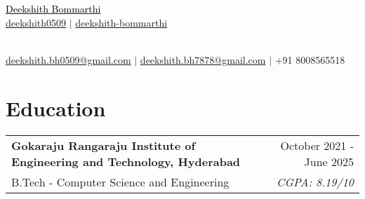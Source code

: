 \documentclass[a4paper,10pt]{article}
\newcommand{\sectionheader}[2]{%
    \begin{center}
        \textcolor{myblue}{\Huge #1} \\[6pt]
        \textcolor{mydarkblue}{\raisebox{-0.05\height}{\faGithub} \href{#2}{deekshith0509}} $|$
        \textcolor{mydarkblue}{\raisebox{-0.05\height}{\faLinkedin} \href{https://www.linkedin.com/in/deekshith-bommarthi}{deekshith-bommarthi}}
    \end{center}
}
\begin{document}
\begin{center}
    \parbox{\linewidth}{%
        \centering
        \sectionheader{\href{https://deekshith0509.github.io/Portfolio.html}{\textcolor{black}{Deekshith Bommarthi}}}{https://github.com/deekshith0509/} \\[2pt]
        \textcolor{mydarkblue}{\raisebox{-0.05\height}{\faEnvelope} \href{mailto:deekshith.bh0509@gmail.com}{deekshith.bh0509@gmail.com}} $|$ 
        \textcolor{mydarkblue}{\href{mailto:deekshith.bh7878@gmail.com}{deekshith.bh7878@gmail.com}} $|$ 
        \textcolor{mydarkblue}{\raisebox{-0.05\height}{\faMobile} +91 8008565518} \\
    }
\end{center}


\section*{Education}
\vspace{5pt}

\begin{tabularx}{\linewidth}{@{} l r @{}}
    \color{myblue} \textbf{Gokaraju Rangaraju Institute of Engineering and Technology, Hyderabad} & \hspace{3.5cm}  \color{mydarkblue} October 2021 - June 2025 \\[1pt] %
    \color{mydarkblue} B.Tech - Computer Science and Engineering &  \vspace{-10pt}\color{mylightpurple} \textit{CGPA: 8.19/10} \\[10pt] %

\end{tabularx}


\newcommand{\skillsentry}[2]{%
    \textcolor{myblue}{\textbf{#1}} & \textcolor{mydarkblue}{#2} \\
}
\newcommand{\skillsentry}[2]{%
    \textcolor{myblue}{\textbf{#1}} & \textcolor{mydarkblue}{#2} \\
}
\vspace{-3pt}
\end{document}
